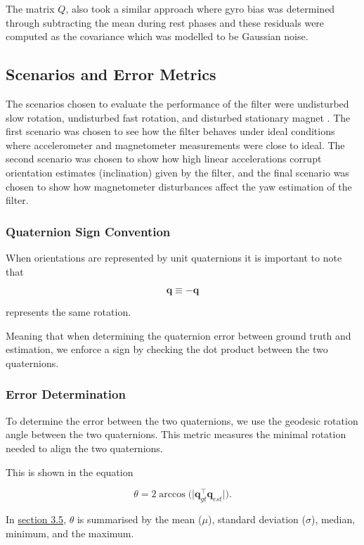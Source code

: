 The matrix $Q$, also took a similar approach where gyro bias was determined through subtracting 
the mean during rest phases and these residuals were computed as the covariance which was modelled to be Gaussian noise. 
\newpage
\subsection{Scenarios and Error Metrics}
The scenarios chosen to evaluate the performance of the filter were undisturbed slow rotation,
undisturbed fast rotation, and disturbed stationary magnet \cite{laidig_2021_broada}. The first scenario was chosen to
see how the filter behaves under ideal conditions where accelerometer and magnetometer measurements
were close to ideal. The second scenario was chosen to show how high linear accelerations corrupt orientation
estimates (inclination) given by the filter, and the final scenario was chosen to show how magnetometer disturbances
affect the yaw estimation of the filter. 

\subsubsection{Quaternion Sign Convention}
When orientations are represented by unit quaternions it is important to note that 

\begin{equation}
\mathbf{q} \equiv -\mathbf{q}
\end{equation}

represents the same rotation. 

Meaning that when determining the quaternion error between ground truth and estimation, we 
enforce a sign by checking the dot product between the two quaternions.

\subsubsection{Error Determination}
To determine the error between the two quaternions, we use the geodesic rotation angle between 
the two quaternions. This metric measures the minimal rotation needed to align the two quaternions. 

This is shown in the equation

\begin{equation}
\theta = 2\arccos\!\Big(\big|\mathbf{q}_{gt}^{\top}\mathbf{q}_{est}\big|\Big).
\end{equation}

In \hyperref[sec:Results]{section 3.5}, $\theta$ is summarised by the mean ($\mu$),
standard deviation ($\sigma$), median, minimum, and the maximum.


